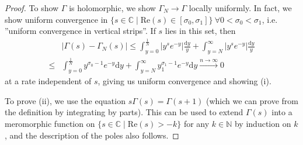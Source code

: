 \documentclass{article}
\theoremstyle{definition}
\begin{document}
\begin{proof}
    To show $\Gamma$ is holomorphic, we show $\Gamma_N \to \Gamma$ locally uniformly. In fact, we show uniform convergence in $\{s \in \mathbb{C} \mid \text{Re}(s) \in [\sigma_0,\sigma_1]\} ~\forall 0<\sigma_0<\sigma_1$, i.e. ''uniform convergence in vertical strips''. If $s$ lies in this set, then 
    \begin{align*}
        &|\Gamma(s)-\Gamma_N(s)| \le \int_{y=0}^{\frac{1}{N}} |y^s e^{-y}| \frac{\mathrm{d}y}{y} + \int_{y=N}^{\infty} |y^s e^{-y}|\frac{\mathrm{d}y}{y} \\ \le& \int_{y=0}^{\frac{1}{N}} y^{\sigma_0-1}e^{-y}\mathrm{d}y   + \int_{y=N}^{\infty} y_1^{\sigma_1-1}e^{-y}\mathrm{d}y \stackrel{n \to \infty}{\to} 0
    \end{align*}
    at a rate independent of $s$, giving us uniform convergence and showing (i).
    \vspace{1mm}

    To prove (ii), we use the equation $s \Gamma(s) = \Gamma(s+1)$ (which we can prove from the definition by integrating by parts). This can be used to extend $\Gamma(s)$ into a meromorphic function on $\{s \in \mathbb{C} \mid \text{Re}(s)>-k\}$ for any $k \in \mathbb{N}$ by induction on $k$, and the description of the poles also follows.
\end{proof}
\end{document}
